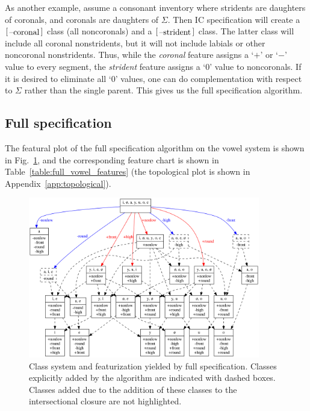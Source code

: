 \documentclass[12pt, oneside]{article}   	%
\newcommand{\featmat}[1]
{$\begin{bsmallmatrix*}[l]\text{\normalsize #1}\end{bsmallmatrix*}$}
\begin{document}
As another example, assume a consonant inventory where stridents are daughters of coronals, and coronals are daughters of $\Sigma$. Then IC specification will create a \featmat{--coronal} class (all noncoronals) and a \featmat{--strident} class. The latter class will include all coronal nonstridents, but it will not include labials or other noncoronal nonstridents. Thus, while the \textit{coronal} feature assigns a `$+$' or `$-$' value to every segment, the \textit{strident} feature assigns a `$0$' value to noncoronals. If it is desired to eliminate all `$0$' values, one can do complementation with respect to $\Sigma$ rather than the single parent. This gives us the full specification algorithm.

\subsection{Full specification}

The featural plot of the full specification algorithm on the vowel system is shown in Fig.~\ref{fig:vowel_inventory_full}, and the corresponding feature chart is shown in Table~\ref{table:full_vowel_features} (the topological plot is shown in Appendix~\ref{app:topological}).

\begin{figure}[htb!]
	\centering
	\includegraphics[width=0.9\textwidth]{vowel_inventory_full_FEATURAL.png}
	\caption{Class system and featurization yielded by full specification.  Classes explicitly added by the algorithm are indicated with dashed boxes. Classes added due to the addition of these classes to the intersectional closure are not highlighted.}
	\label{fig:vowel_inventory_full}
\end{figure}
\end{document}
